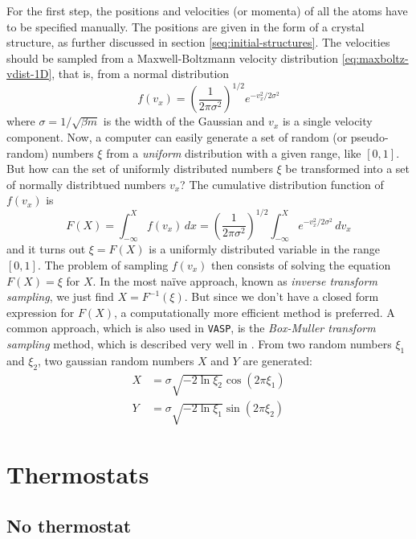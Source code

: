 \documentclass[11pt,bibliography=totoc,index=totoc]{scrbook}   %
\newcommand{\vasp}{{\texttt{VASP}}} %
\begin{document}
For the first step, the positions and velocities (or momenta) of all the atoms have to be specified manually. 
The positions are given in the form of a crystal structure, as further discussed in section \ref{seq:initial-structures}.
The velocities should be sampled from a Maxwell-Boltzmann velocity distribution \eqref{eq:maxboltz-vdist-1D},
that is, from a normal distribution
\begin{equation}
    f(v_x) = \left(\frac{1}{2\pi\sigma^2}\right)^{1/2} e^{-v_x^2/2\sigma^2}
  \label{eq:normal-dist}
\end{equation}
where $\sigma=1/\sqrt{\beta m}$ is the width of the Gaussian and $v_x$ is a single velocity component.
Now, a computer can easily generate a set of random (or pseudo-random) numbers $\xi$ from a \emph{uniform} distribution with a given range, like $[0,1]$.
But how can the set of uniformly distributed numbers $\xi$ be transformed into a set of normally distribtued numbers $v_x$?
The cumulative distribution function of $f(v_x)$ is
\begin{equation}
    F(X) = \int_{-\infty}^X f(v_x)\,dx = \left(\frac{1}{2\pi\sigma^2}\right)^{1/2} \int_{-\infty}^X e^{-v_x^2/2\sigma^2} \,dv_x
    \label{eq:CDF}
\end{equation}
and it turns out $\xi = F(X)$ is a uniformly distributed variable in the range $[0,1]$. 
The problem of sampling $f(v_x)$ then consists of solving the equation $F(X)=\xi$ for $X$.
In the most naïve approach, known as \emph{inverse transform sampling}, we just find $X=F^{-1}(\xi)$.
But since we don't have a closed form expression for $F(X)$, a computationally more efficient method is preferred. 
A common approach, which is also used in \vasp, is the \emph{Box-Muller transform sampling} method, which is
described very well in \cite[101]{Tuckerman:2010}. 
From two random numbers $\xi_1$ and $\xi_2$, two gaussian random numbers $X$ and $Y$ are generated:
\begin{align}
    X &= \sigma \sqrt{-2\ln\xi_2} \cos(2\pi\xi_1) \\
    Y &= \sigma \sqrt{-2\ln\xi_1} \sin(2\pi\xi_2)
  \label{eq:box-muller-sampling}
\end{align}



\section{Thermostats}

\subsection{No thermostat}
\end{document}
